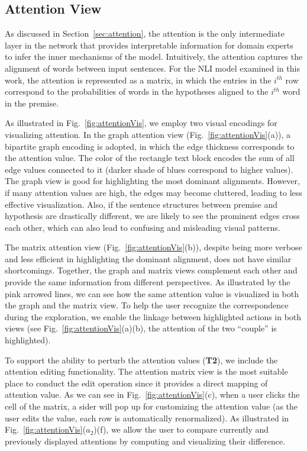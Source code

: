 

\subsection{Attention View}
\label{sec:attentionView}
As discussed in Section~\ref{sec:attention}, the attention is the only intermediate layer in the network that provides interpretable information for domain experts to infer the inner mechanisms of the model.
%
Intuitively, the attention captures the alignment of words between input sentences. For the NLI model examined in this work, the attention is represented as a matrix, in which the entries in the $i^{th}$ row correspond to the probabilities of words in the hypotheses aligned to the $i^{th}$ word in the premise.

As illustrated in Fig.~\ref{fig:attentionVis}, we employ two visual encodings for visualizing attention. In the graph attention view (Fig.~\ref{fig:attentionVis}(a)), a bipartite graph encoding is adopted, in which the edge thickness corresponds to the attention value. The color of the rectangle text block encodes the sum of all edge values connected to it (darker shade of blues correspond to higher values).
%
The graph view is good for highlighting the most dominant alignments. However, if many attention values are high, the edges may become cluttered, leading to less effective visualization. Also, if the sentence structures between premise and hypothesis are drastically different, we are likely to see the prominent edges cross each other, which can also lead to confusing and misleading visual patterns.

The matrix attention view (Fig.~\ref{fig:attentionVis}(b)), despite being more verbose and less efficient in highlighting the dominant alignment, does not have similar shortcomings. Together, the graph and matrix views complement each other and provide the same information from different perspectives. As illustrated by the pink arrowed lines, we can see how the same attention value is visualized in both the graph and the matrix view.
To help the user recognize the correspondence during the exploration, we enable the linkage between highlighted actions in both views (see Fig.~\ref{fig:attentionVis}(a)(b), the attention of the two ``couple'' is highlighted).

To support the ability to perturb the attention values (\textbf{T2}), we include the attention editing functionality. The attention matrix view is the most suitable place to conduct the edit operation since it provides a direct mapping of attention value.
As we can see in Fig.~\ref{fig:attentionVis}(c), when a user clicks the cell of the matrix, a sider will pop up for customizing the attention value (as the user edits the value, each row is automatically renormalized).
%
As illustrated in Fig.~\ref{fig:attentionVis}($a_{2}$)(f), we allow the user to compare currently and previously displayed attentions by computing and visualizing their difference.


